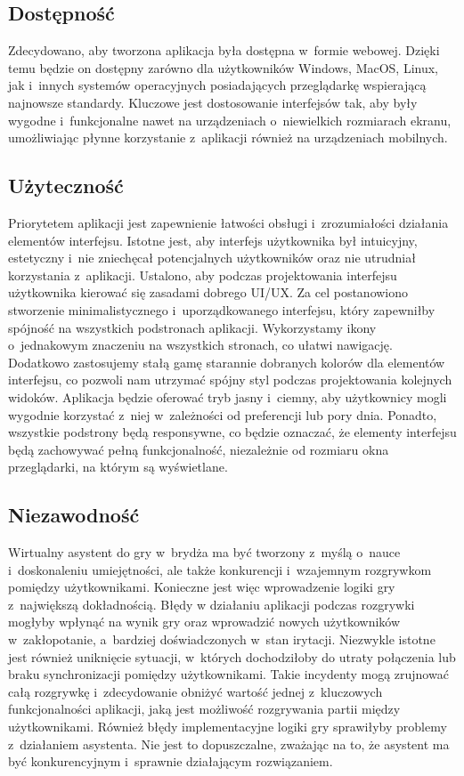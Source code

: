 \subsection{Dostępność}
Zdecydowano, aby tworzona aplikacja była dostępna w~formie webowej.
Dzięki temu będzie on dostępny zarówno dla użytkowników
Windows, MacOS, Linux, jak i~innych systemów operacyjnych posiadających
przeglądarkę wspierającą najnowsze standardy.
Kluczowe jest dostosowanie interfejsów tak,
aby były wygodne i~funkcjonalne nawet na urządzeniach o~niewielkich
rozmiarach ekranu, umożliwiając płynne korzystanie z~aplikacji również
na urządzeniach mobilnych.


\subsection{Użyteczność}
Priorytetem aplikacji jest zapewnienie łatwości obsługi
i~zrozumiałości działania elementów interfejsu.
Istotne jest, aby interfejs użytkownika
był intuicyjny, estetyczny i~nie zniechęcał potencjalnych użytkowników
oraz nie utrudniał korzystania z~aplikacji. Ustalono, aby podczas
projektowania interfejsu użytkownika kierować się zasadami
dobrego UI/UX.
Za cel postanowiono stworzenie minimalistycznego i~uporządkowanego
interfejsu, który zapewniłby spójność na wszystkich podstronach aplikacji.
Wykorzystamy ikony o~jednakowym znaczeniu na wszystkich stronach,
co ułatwi nawigację. Dodatkowo zastosujemy stałą gamę starannie
dobranych kolorów dla elementów interfejsu, co pozwoli nam utrzymać
spójny styl podczas projektowania kolejnych widoków. Aplikacja
będzie oferować tryb jasny i~ciemny, aby użytkownicy mogli wygodnie
korzystać z~niej w~zależności od preferencji lub pory dnia.
Ponadto, wszystkie podstrony będą responsywne, co będzie oznaczać,
że elementy interfejsu będą zachowywać pełną funkcjonalność,
niezależnie od rozmiaru okna przeglądarki, na którym są wyświetlane.

\subsection{Niezawodność}
Wirtualny asystent do gry w~brydża ma być tworzony z~myślą o~nauce
i~doskonaleniu umiejętności, ale także konkurencji i~wzajemnym
rozgrywkom pomiędzy użytkownikami. Konieczne jest więc wprowadzenie logiki
gry z~największą dokładnością. Błędy w działaniu aplikacji podczas
rozgrywki mogłyby wpłynąć na wynik gry oraz wprowadzić nowych użytkowników
w~zakłopotanie, a~bardziej doświadczonych w~stan irytacji.
Niezwykle istotne jest również uniknięcie sytuacji, w~których
dochodziłoby do utraty połączenia lub braku synchronizacji pomiędzy
użytkownikami. Takie incydenty mogą zrujnować całą rozgrywkę i~zdecydowanie
obniżyć wartość jednej z~kluczowych funkcjonalności aplikacji, jaką
jest możliwość rozgrywania partii między użytkownikami.
Również błędy implementacyjne logiki gry sprawiłyby problemy
z~działaniem asystenta. Nie jest to dopuszczalne, zważając na to,
że asystent ma być konkurencyjnym i~sprawnie działającym rozwiązaniem.


